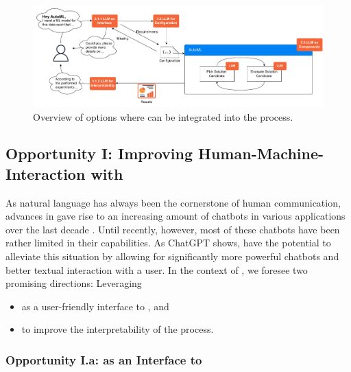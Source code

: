 \begin{figure}
    \centering
    \includegraphics[width=1.\textwidth]{chapters/human-centric/llm/img/llms_for_automl_overview_3.pdf}
    \caption{Overview of options where \LLMs can be integrated into the \AutoML process.}
    \label{llm-fig:llms_for_automl_overview}
\end{figure}

\subsection{Opportunity I: Improving Human-Machine-Interaction with \LLMs}
\label{llm-ssec:hmi-with-llms}

As natural language has always been the cornerstone of human communication, advances in \NLP gave rise to an increasing amount of chatbots in various applications over the last decade \cite{adamopoulou-mla20}. Until recently, however, most of these chatbots have been rather limited in their capabilities. As ChatGPT \cite{openai-openai22a} shows, \LLMs have the potential to alleviate this situation by allowing for significantly more powerful chatbots and better textual interaction with a user. In the context of \AutoML, we foresee two promising directions: Leveraging \LLMs
\begin{itemize}[(i)]
    \item as a user-friendly interface to \AutoML, and
    \item to improve the interpretability of the \AutoML process.
\end{itemize}


\subsubsection{Opportunity I.a:  \LLMs as an Interface to \AutoML}
\label{llm-ssec:llms-as-interface-to-automl}

